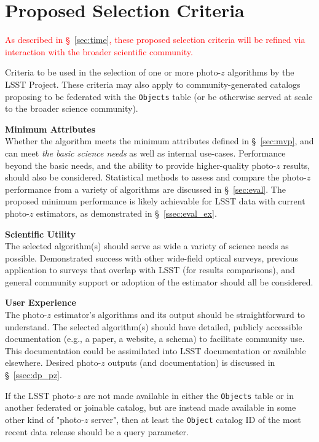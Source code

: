 \documentclass[DM,lsstdraft,toc]{lsstdoc}
\begin{document}
\clearpage
\section{Proposed Selection Criteria} \label{sec:sel}

\textcolor{red}{As described in \S~\ref{sec:time}, these proposed selection criteria will be refined via interaction with the broader scientific community.}

Criteria to be used in the selection of one or more photo-$z$ algorithms by the LSST Project. These criteria may also apply to community-generated catalogs proposing to be federated with the {\tt Objects} table (or be otherwise served at scale to the broader science community).

{\bf Minimum Attributes}\\
Whether the algorithm meets the minimum attributes defined in \S~\ref{sec:mvp}, and can meet {\it the basic science needs} as well as internal use-cases.
Performance beyond the basic needs, and the ability to provide higher-quality photo-$z$ results, should also be considered.
Statistical methods to assess and compare the photo-$z$ performance from a variety of algorithms are discussed in \S~\ref{sec:eval}.
The proposed minimum performance is likely achievable for LSST data with current photo-$z$ estimators, as demonstrated in \S~\ref{ssec:eval_ex}.

{\bf Scientific Utility}\\
The selected algorithm(s) should serve as wide a variety of science needs as possible.
Demonstrated success with other wide-field optical surveys, previous application to surveys that overlap with LSST (for results comparisons), and general community support or adoption of the estimator should all be considered.

{\bf User Experience}\\
The photo-$z$ estimator's algorithms and its output should be straightforward to understand.
The selected algorithm(s) should have detailed, publicly accessible documentation (e.g., a paper, a website, a schema) to facilitate community use.
This documentation could be assimilated into LSST documentation or available elsewhere.
Desired photo-$z$ outputs (and documentation) is discussed in \S~\ref{ssec:dp_pz}.

If the LSST photo-$z$ are not made available in either the {\tt Objects} table or in another federated or joinable catalog, but are instead made available in some other kind of "photo-$z$ server", then at least the {\tt Object} catalog ID of the most recent data release should be a query parameter.
\end{document}
